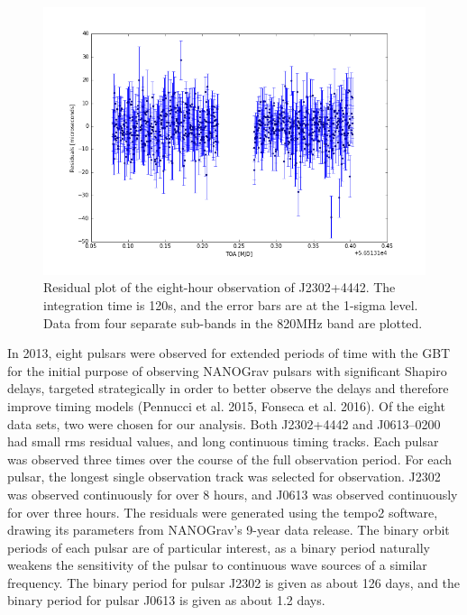 \documentclass[12pt]{article}
\begin{document}
\begin{figure}[h!]
    \caption{Residual plot of the eight-hour observation of J2302+4442. The
integration time is 120s, and the error bars are at the 1-sigma level. Data from
four separate sub-bands in the 820MHz band are plotted.}
    \includegraphics[width=\textwidth]{./figures/J2302_residuals.png}
\end{figure}

   In 2013, eight pulsars were observed for extended periods of time with the GBT for the
initial purpose of observing NANOGrav pulsars with significant Shapiro delays,
targeted strategically in order to better observe the delays and therefore
improve timing models (Pennucci et al. 2015, Fonseca et al. 2016). 
Of the eight data sets, two were chosen for our
analysis. Both J2302+4442 and J0613--0200 had small rms residual values, and
long continuous timing tracks.  Each pulsar was observed three times over the
course of the full observation period.  For each pulsar, the longest single
observation track was selected for observation. J2302 was observed continuously
for over 8 hours, and J0613 was observed continuously for over three hours.
The residuals were generated using the tempo2 software, drawing its parameters
from NANOGrav's 9-year data release. The binary orbit periods of each pulsar
are of particular interest, as a binary period naturally weakens the
sensitivity of the pulsar to continuous wave sources of a similar frequency.
The binary period for pulsar J2302 is given as about 126 days, and the binary
period for pulsar J0613 is given as about 1.2 days.
\end{document}
